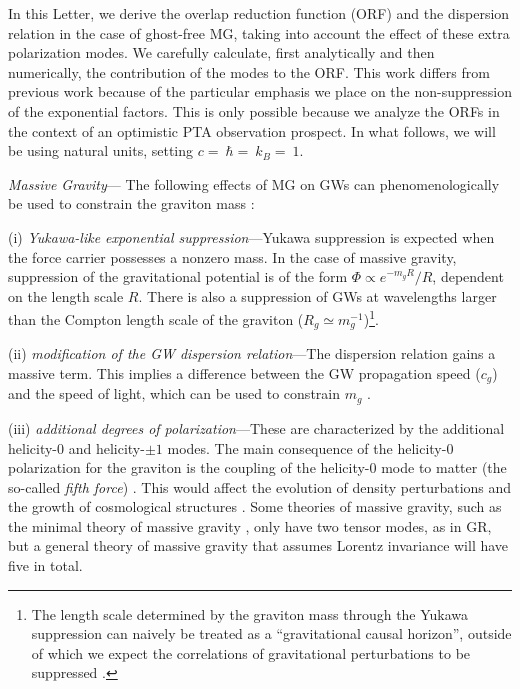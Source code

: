 \documentclass[prd,twocolumn,aps,psfig,nofootinbib,nobibnotes,superscriptaddress,preprintnumbers,times]{revtex4-2}
\begin{document}
In this Letter, we derive the overlap reduction function (ORF) and the dispersion relation in the case of ghost-free MG, taking into account the effect of these extra polarization modes. We carefully calculate, first analytically and then numerically, the contribution of the modes to the ORF. 
This work differs from previous work \cite{Liang:2021bct, Anholm:2008wy, Arjona:2024cex, Lee:2013awh} because of the particular emphasis we place on the non-suppression of the exponential factors. This is only possible because we analyze the ORFs in the context of an optimistic PTA observation prospect. In what follows, we will be using natural units, setting $c = $$\ \hbar = $$\ k_B = $$\ 1$.


\textit{Massive Gravity}---
The following effects of MG on GWs can phenomenologically be used to constrain the graviton mass \cite{deRham:2016nuf}:

(i) \textit{Yukawa-like exponential suppression}---Yukawa suppression is expected when the force carrier possesses a nonzero mass. In the case of massive gravity, suppression of the gravitational potential is of the form $\Phi \propto e^{-m_gR}/R$, dependent on the length scale $R$. There is also a suppression of GWs at wavelengths larger than the Compton length scale of the graviton ($R_g \simeq m_g^{-1}$)\footnote{The length scale determined by the graviton mass through the Yukawa suppression can naively be treated as a ``gravitational causal horizon'', outside of which we expect the correlations of gravitational perturbations to be suppressed \cite{Will:1997bb}.}.

(ii) \textit{modification of the GW dispersion relation}---The dispersion relation gains a massive term. This implies a difference between the GW propagation speed ($c_g$) and the speed of light, which can be used to constrain $m_g$ \cite{LIGOScientific:2017vwq, LIGOScientific:2017zic, LIGOScientific:2017ync}. 

(iii) \textit{additional degrees of polarization}---These are characterized by the additional helicity-$0$ and helicity-$\pm 1$ modes. The main consequence of the helicity-$0$ polarization for the graviton is the coupling of the helicity-0 mode to matter (the so-called {\it fifth force}) \cite{deRham:2014naa}. This would affect the evolution of density perturbations and the growth of cosmological structures \cite{Sipp:2022kmb}. Some theories of massive gravity, such as the minimal theory of massive gravity \cite{DeFelice:2015hla}, only have two tensor modes, as in GR, but a general theory of massive gravity that assumes Lorentz invariance will have five in total.
\end{document}
